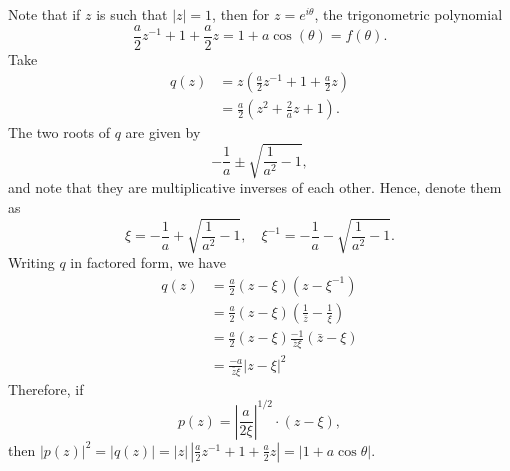 \documentclass{homework}
\begin{document}
\begin{solution}

Note that if $z$ is such that $|z| = 1$, then for $z = e^{i\theta}$, the trigonometric polynomial
$$
  \frac a2 z^{-1} + 1 + \frac a2 z = 1 + a\cos(\theta) = f(\theta).
$$
Take 
\begin{align*}
  q(z) 
  &= z\left(\frac a2 z^{-1} + 1 + \frac a2 z\right)\\
  &= \frac a2 \left(z^2 + \frac 2az + 1\right).
\end{align*}
The two roots of $q$ are given by 
$$
-\frac 1a \pm \sqrt{\frac{1}{a^2} - 1},
$$
and note that they are multiplicative inverses of each other.  Hence, denote them as
$$
\xi = -\frac 1a + \sqrt{\frac{1}{a^2} - 1},\quad \xi^{-1}=-\frac 1a - \sqrt{\frac{1}{a^2} - 1}.
$$
Writing $q$ in factored form, we have
\begin{align*}
  q(z) 
  &= \frac a2 (z - \xi)(z - \xi^{-1})\\
  &= \frac a2 (z - \xi) \left(\frac 1{\bar z} - \frac 1\xi\right)\\
  &= \frac a2 (z - \xi) \frac {-1}{\bar z \xi} (\bar z - \xi)\\
  &= \frac{-a}{\bar z \xi} |z- \xi|^2
\end{align*}
Therefore, if 
$$
  p(z) = \left|\frac{a}{2\xi}\right|^{1/2} \cdot (z - \xi),
$$
then $|p(z)|^2 = |q(z)| = |z|\, \left|\frac a2 z^{-1} + 1 + \frac a2 z\right| = |1 + a\cos\theta|$.

\end{solution}
\end{document}
